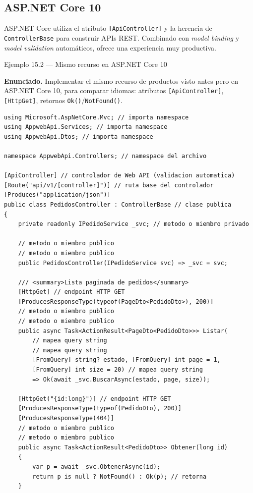 \subsection{ASP.NET Core 10}

ASP.NET Core utiliza el atributo \texttt{[ApiController]} y
la herencia de \texttt{ControllerBase} para construir APIs REST.
Combinado con \emph{model binding} y \emph{model validation}
automáticos, ofrece una experiencia muy productiva.


\begin{cajaejemplo}{Ejemplo 15.2 --- Mismo recurso en ASP.NET Core 10}

\textbf{Enunciado.} Implementar el mismo recurso de productos visto antes pero en ASP.NET Core 10, para comparar idiomas: atributos \texttt{[ApiController]}, \texttt{[HttpGet]}, retornos \texttt{Ok()}/\texttt{NotFound()}.

\begin{lstlisting}[style=cs,caption={PedidosController.cs},label=lst:15.4]
using Microsoft.AspNetCore.Mvc; // importa namespace
using AppwebApi.Services; // importa namespace
using AppwebApi.Dtos; // importa namespace

namespace AppwebApi.Controllers; // namespace del archivo

[ApiController] // controlador de Web API (validacion automatica)
[Route("api/v1/[controller]")] // ruta base del controlador
[Produces("application/json")]
public class PedidosController : ControllerBase // clase publica
{
    private readonly IPedidoService _svc; // metodo o miembro privado

    // metodo o miembro publico
    // metodo o miembro publico
    public PedidosController(IPedidoService svc) => _svc = svc;

    /// <summary>Lista paginada de pedidos</summary>
    [HttpGet] // endpoint HTTP GET
    [ProducesResponseType(typeof(PageDto<PedidoDto>), 200)]
    // metodo o miembro publico
    // metodo o miembro publico
    public async Task<ActionResult<PageDto<PedidoDto>>> Listar(
        // mapea query string
        // mapea query string
        [FromQuery] string? estado, [FromQuery] int page = 1,
        [FromQuery] int size = 20) // mapea query string
        => Ok(await _svc.BuscarAsync(estado, page, size));

    [HttpGet("{id:long}")] // endpoint HTTP GET
    [ProducesResponseType(typeof(PedidoDto), 200)]
    [ProducesResponseType(404)]
    // metodo o miembro publico
    // metodo o miembro publico
    public async Task<ActionResult<PedidoDto>> Obtener(long id)
    {
        var p = await _svc.ObtenerAsync(id);
        return p is null ? NotFound() : Ok(p); // retorna
    }


\end{lstlisting}
\end{cajaejemplo}
